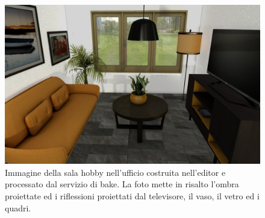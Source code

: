 \begin{figure}[htb]
 \centering
 \includegraphics[width=0.9\linewidth]{images/chapter_prove_sperimentali/scena_office_hobby.png}\hfill
 \caption[Ambiente virtuale: Ufficio sala hobby]{Immagine della sala hobby nell'ufficio costruita nell'editor e processato dal servizio di bake. La foto mette in risalto l'ombra proiettate ed i riflessioni proiettati dal televisore, il vaso, il vetro ed i quadri.}
 \label{fig:prove_sperimentali_qualita_visiva_ufficio_hobby}
\end{figure}